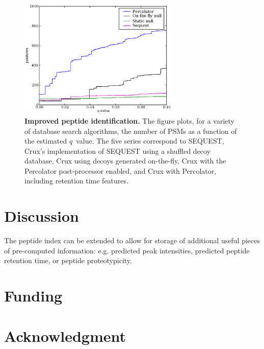 \documentclass{bioinfo}
\begin{document}
\begin{figure}
\centering
\includegraphics[width=3in]{./Images/q-value.eps}
\caption{{\bf Improved peptide identification.}  The figure plots, for
  a variety of database search algorithms, the number of PSMs as a
  function of the estimated $q$~value.  The five series correspond to
  SEQUEST, Crux's implementation of SEQUEST using a shuffled decoy
  database, Crux using decoys generated on-the-fly, Crux with the
  Percolator post-processor enabled, and Crux with Percolator,
  including retention time features.
  \label{figure:pq-plot}}
\end{figure}

\section{Discussion}

The peptide index can be extended to allow for
storage of additional useful pieces of pre-computed information: 
e.g.  predicted peak intensities, predicted peptide retention time,
or peptide proteotypicity.  %


\section*{Funding}

\section*{Acknowledgment}







 
\end{document}
